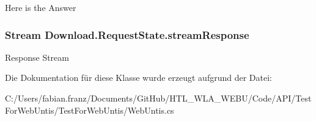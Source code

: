 Here is the Answer \hypertarget{class_download_1_1_request_state_a30cef36e2cceb6a4e1b2a446247e60be}{
\subsubsection[{stream\-Response}]{\setlength{\rightskip}{0pt plus 5cm}Stream Download.\-Request\-State.\-stream\-Response}}\label{class_download_1_1_request_state_a30cef36e2cceb6a4e1b2a446247e60be}
Response Stream 

Die Dokumentation für diese Klasse wurde erzeugt aufgrund der Datei\-:\begin{DoxyCompactItemize}
\item 
C\-:/\-Users/fabian.\-franz/\-Documents/\-Git\-Hub/\-H\-T\-L\-\_\-\-W\-L\-A\-\_\-\-W\-E\-B\-U/\-Code/\-A\-P\-I/\-Test\-For\-Web\-Untis/\-Test\-For\-Web\-Untis/Web\-Untis.\-cs\end{DoxyCompactItemize}
